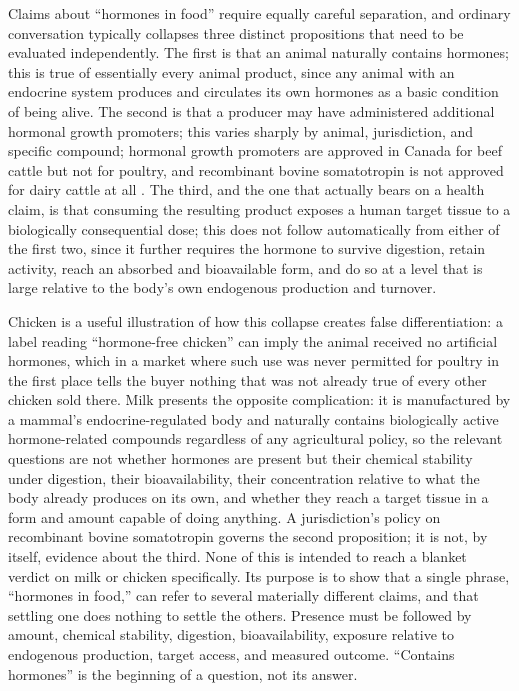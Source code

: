 \documentclass[11pt]{article}
\begin{document}
Claims about ``hormones in food'' require equally careful separation, and ordinary conversation typically collapses three distinct propositions that need to be evaluated independently. The first is that an animal naturally contains hormones; this is true of essentially every animal product, since any animal with an endocrine system produces and circulates its own hormones as a basic condition of being alive. The second is that a producer may have administered additional hormonal growth promoters; this varies sharply by animal, jurisdiction, and specific compound; hormonal growth promoters are approved in Canada for beef cattle but not for poultry, and recombinant bovine somatotropin is not approved for dairy cattle at all \citep{healthcanada2022hormones,bcgov2013chicken}. The third, and the one that actually bears on a health claim, is that consuming the resulting product exposes a human target tissue to a biologically consequential dose; this does not follow automatically from either of the first two, since it further requires the hormone to survive digestion, retain activity, reach an absorbed and bioavailable form, and do so at a level that is large relative to the body's own endogenous production and turnover.

Chicken is a useful illustration of how this collapse creates false differentiation: a label reading ``hormone-free chicken'' can imply the animal received no artificial hormones, which in a market where such use was never permitted for poultry in the first place tells the buyer nothing that was not already true of every other chicken sold there. Milk presents the opposite complication: it is manufactured by a mammal's endocrine-regulated body and naturally contains biologically active hormone-related compounds regardless of any agricultural policy, so the relevant questions are not whether hormones are present but their chemical stability under digestion, their bioavailability, their concentration relative to what the body already produces on its own, and whether they reach a target tissue in a form and amount capable of doing anything. A jurisdiction's policy on recombinant bovine somatotropin governs the second proposition; it is not, by itself, evidence about the third. None of this is intended to reach a blanket verdict on milk or chicken specifically. Its purpose is to show that a single phrase, ``hormones in food,'' can refer to several materially different claims, and that settling one does nothing to settle the others. Presence must be followed by amount, chemical stability, digestion, bioavailability, exposure relative to endogenous production, target access, and measured outcome. ``Contains hormones'' is the beginning of a question, not its answer.
\end{document}
